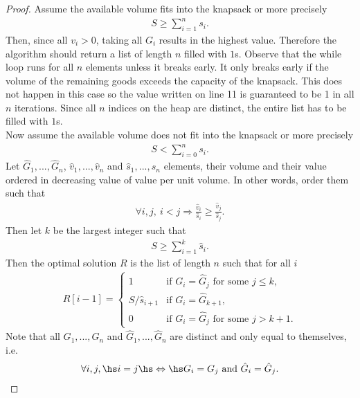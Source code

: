 \documentclass{article}
\begin{document}
\begin{proof}
	Assume the available volume fits into the knapsack or more precisely
	\begin{align*}
		S \geq \sum_{i=1}^n s_i.
	\end{align*}
	Then, since all $v_i>0$, taking all $G_i$ results in the highest value.
	Therefore the algorithm should return a list of length $n$ filled with
	$1$s. Observe that the while loop runs for all $n$ elements unless it
	breaks early. It only breaks early if the volume of the remaining goods
	exceeds the capacity of the knapsack. This does not happen in this case
	so the value written on line 11 is guaranteed to be 1 in all $n$
	iterations. Since all $n$ indices on the heap are distinct, the entire
	list has to be filled with $1$s.\\
	Now assume the available volume does not fit into the knapsack or more
	precisely
	\begin{align*}
		S < \sum_{i=0}^n s_i.
	\end{align*}
	Let $\hat G_1, ...,\hat G_n$, $\hat v_1, ...,\hat v_n$ and $\hat s_1, ...,\hat s_n$
	elements, their volume and their value ordered in decreasing value of value per unit
	volume. In other words, order them such that
	\begin{align}
		\label{iord}
		\forall i,j,\: i < j \Rightarrow \frac{\hat v_i}{\hat s_i}\geq \frac{\hat v_j}{\hat s_j}.
	\end{align}
	Then let $k$ be the largest integer such that
	\begin{align*}
		S \geq \sum_{i=1}^k \hat s_i.
	\end{align*}
	Then the optimal solution $R$ is the list of length $n$ such that for all $i$
	\begin{align}
		\label{optsol}
		R[i-1] = \begin{cases}
			         1              & \text{if } G_i = \hat G_j \text{ for some } j \leq k, \\
			         S/\hat s_{i+1} & \text{if } G_i = \hat G_{k+1},                        \\
			         0              & \text{if } G_i = \hat G_j \text{ for some } j > k+1.
		         \end{cases}
	\end{align}
	Note that all $G_1, ..., G_n$ and $\hat G_1, ..., \hat G_n$ are distinct
	and only equal to themselves, i.e.
	\begin{align*}
		\forall i,j,\hs i=j \hs \Leftrightarrow \hs G_i = G_j \text{ and } \hat G_i = \hat G_j.
	\end{align*}

\end{proof}
\end{document}
